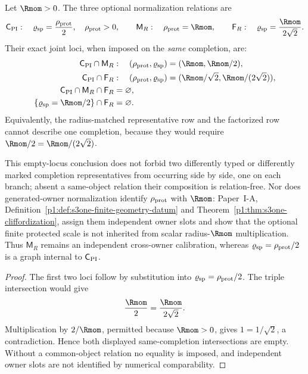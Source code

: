 \documentclass[11pt,a4paper]{article}
\begin{document}
\begin{proposition}
\label{p2e:prop:joint-protected-scale-loci}
Let \(\Rmom>0\).  The three optional normalization relations are
\[
 \mathsf C_{\rm PI}:\quad
   \varrho_{\rm sp}=\frac{\rho_{\rm prot}}2,\quad
   \rho_{\rm prot}>0,
 \qquad
 \mathsf M_R:\quad \rho_{\rm prot}=\Rmom,
 \qquad
 \mathsf F_R:\quad
   \varrho_{\rm sp}=\frac{\Rmom}{2\sqrt2}.
\]
Their exact joint loci, when imposed on the \emph{same} completion, are:
\begin{align*}
 \mathsf C_{\rm PI}\cap\mathsf M_R
 &:\quad
 (\rho_{\rm prot},\varrho_{\rm sp})
   =(\Rmom,\Rmom/2),\\
 \mathsf C_{\rm PI}\cap\mathsf F_R
 &:\quad
 (\rho_{\rm prot},\varrho_{\rm sp})
   =(\Rmom/\sqrt2,\Rmom/(2\sqrt2)),\\
 \mathsf C_{\rm PI}\cap\mathsf M_R\cap\mathsf F_R
 &=\varnothing,\\
 \{\varrho_{\rm sp}=\Rmom/2\}\cap\mathsf F_R
 &=\varnothing.
\end{align*}
Equivalently, the radius-matched representative row and the factorized row
cannot describe one completion, because they would require
\(\Rmom/2=\Rmom/(2\sqrt2)\).

This empty-locus conclusion does not forbid two differently typed or
differently marked completion representatives from occurring side by side,
one on each branch; absent a same-object relation their composition is
relation-free.  Nor does generated-owner normalization identify
\(\rho_{\rm prot}\) with \(\Rmom\): Paper~I-A,
Definition~\ref{p1:def:s3one-finite-geometry-datum} and
Theorem~\ref{p1:thm:s3one-cliffordization}, assign them independent owner
slots and show that the optional finite protected scale is not inherited from
scalar radius-\(\Rmom\) multiplication.  Thus \(\mathsf M_R\) remains an
independent cross-owner calibration, whereas
\(\varrho_{\rm sp}=\rho_{\rm prot}/2\) is a graph internal to
\(\mathsf C_{\rm PI}\).
\end{proposition}

\begin{proof}
The first two loci follow by substitution into
\(\varrho_{\rm sp}=\rho_{\rm prot}/2\).  The triple intersection would give
\[
 \frac{\Rmom}{2}=\frac{\Rmom}{2\sqrt2}.
\]
Multiplication by \(2/\Rmom\), permitted because \(\Rmom>0\), gives
\(1=1/\sqrt2\), a contradiction.  Hence both displayed same-completion
intersections are empty.  Without a common-object relation no equality is
imposed, and independent owner slots are not identified by numerical
comparability.
\end{proof}
\end{document}
